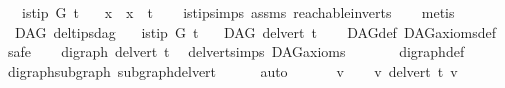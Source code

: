 \begin{isabellebody}
\ \ \ {\isachardoublequoteopen}is{\isacharunderscore}{\kern0pt}tip\ G\ t{\isachardoublequoteclose}\isanewline
\ \ \ {\isachardoublequoteopen}{\isasymforall}x{\isachardot}{\kern0pt}\ {\isasymnot}\ x\ {\isasymrightarrow}\isactrlsup {\isacharplus}{\kern0pt}\ t{\isachardoublequoteclose}\isanewline
%
\isadelimproof
\ \ %
\endisadelimproof
%
\isatagproof
{}\isamarkupfalse%
\ is{\isacharunderscore}{\kern0pt}tip{\isachardot}{\kern0pt}simps\ assms\ reachable{}{\isacharunderscore}{\kern0pt}in{\isacharunderscore}{\kern0pt}verts{\isacharparenleft}{\kern0pt}{}{\isacharparenright}{\kern0pt}\isanewline
\ \ \isamarkupfalse%
\ metis%
\endisatagproof
{\isafoldproof}%
%
\isadelimproof
\ \isanewline
%
\endisadelimproof
\isanewline
{}\isamarkupfalse%
\ {\isacharparenleft}{\kern0pt}\ DAG{\isacharparenright}{\kern0pt}\ del{\isacharunderscore}{\kern0pt}tips{\isacharunderscore}{\kern0pt}dag{\isacharcolon}{\kern0pt}\isanewline
\ \ \ {\isachardoublequoteopen}is{\isacharunderscore}{\kern0pt}tip\ G\ t{\isachardoublequoteclose}\isanewline
\ \ \ {\isachardoublequoteopen}DAG\ {\isacharparenleft}{\kern0pt}del{\isacharunderscore}{\kern0pt}vert\ t{\isacharparenright}{\kern0pt}{\isachardoublequoteclose}\isanewline
%
\isadelimproof
\ \ %
\endisadelimproof
%
\isatagproof
{}\isamarkupfalse%
\ DAG{\isacharunderscore}{\kern0pt}def\ DAG{\isacharunderscore}{\kern0pt}axioms{\isacharunderscore}{\kern0pt}def\isanewline
{}\isamarkupfalse%
\ safe\isanewline
\ \ \isamarkupfalse%
\ {\isachardoublequoteopen}digraph\ {\isacharparenleft}{\kern0pt}del{\isacharunderscore}{\kern0pt}vert\ t{\isacharparenright}{\kern0pt}{\isachardoublequoteclose}\ \isamarkupfalse%
\ del{\isacharunderscore}{\kern0pt}vert{\isacharunderscore}{\kern0pt}simps\ DAG{\isacharunderscore}{\kern0pt}axioms\ \isanewline
\ \ \ \ \ \ digraph{\isacharunderscore}{\kern0pt}def\isanewline
\ \ \ \ \isamarkupfalse%
\ digraph{\isacharunderscore}{\kern0pt}subgraph\ subgraph{\isacharunderscore}{\kern0pt}del{\isacharunderscore}{\kern0pt}vert\isanewline
\ \ \ \ \isamarkupfalse%
\ auto\ \isanewline
{}\isamarkupfalse%
\ \isanewline
\ \ \isamarkupfalse%
\ v\isanewline
\ \ \isamarkupfalse%
\ {\isachardoublequoteopen}v\ {\isasymrightarrow}\isactrlsup {\isacharplus}{\kern0pt}\isactrlbsub del{\isacharunderscore}{\kern0pt}vert\ t\isactrlesub \ v{\isachardoublequoteclose}\isanewline

\end{isabellebody}
